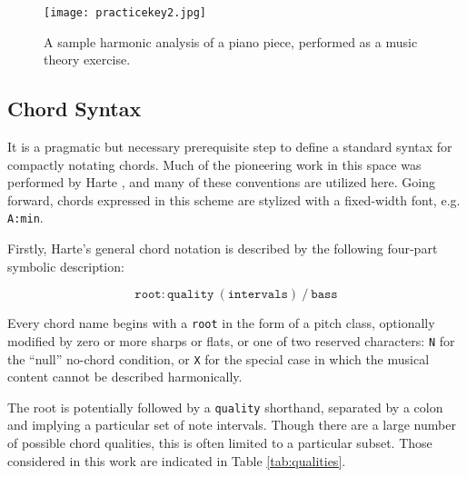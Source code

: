 \begin{figure}[t]
\centering
\texttt{[image: practicekey2.jpg]}
\caption{A sample harmonic analysis of a piano piece, performed as a music theory exercise.}
\label{fig:mthomework}
\end{figure}


\subsection{Chord Syntax}
\label{sec:chord_syntax}

It is a pragmatic but necessary prerequisite step to define a standard syntax for compactly notating chords.
Much of the pioneering work in this space was performed by Harte \cite{Harte2005Symbolic}, and many of these conventions are utilized here.
Going forward, chords expressed in this scheme are stylized with a fixed-width font, e.g. \texttt{A:min}.

Firstly, Harte's general chord notation is described by the following four-part symbolic description:

\begin{equation}
\texttt{root}:\texttt{quality}~(\texttt{intervals})~/~\texttt{bass}
\end{equation}

\noindent Every chord name begins with a \texttt{root} in the form of a pitch class, optionally modified by zero or more sharps or flats, or one of two reserved characters: \texttt{N} for the ``null'' no-chord condition, or \texttt{X} for the special case in which the musical content cannot be described harmonically.

The root is potentially followed by a \texttt{quality} shorthand, separated by a colon and implying a particular set of note intervals.
Though there are a large number of possible chord qualities, this is often limited to a particular subset.
Those considered in this work are indicated in Table \ref{tab:qualities}.

